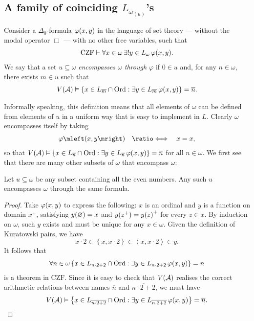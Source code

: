 \documentclass[12pt,openany]{book}
\theoremstyle{plain}
\theoremstyle{definition}
\newcommand\tuple[1]{\left\langle #1 \right\rangle}
\newcommand\opA[1]{\mathop{\forall #1}}
\newcommand\opE[1]{\mathop{\exists #1}}
\newcommand\defeqv{\quad \ratio\Longleftrightarrow \quad}
\newcommand\CZF{\mathrm{CZF}}
\newcommand\Ord{\mathrm{Ord}}
\begin{document}
\subsection*{A family of coinciding $L_{\overline{\omega}_{(u)}}$'s}

Consider a $\Delta_0$-formula $\varphi\mleft(x, y\mright)$ in the language of set theory --- without the modal operator $\Box$ --- with no other free variables, such that
\[\CZF \vdash \opA{x \in \omega} \opE{!y \in L_\omega} \varphi\mleft(x, y\mright).\]
We say that a set $u \subseteq \omega$ \emph{encompasses $\omega$ through $\varphi$} if $0 \in u$ and, for any $n \in \omega$, there exists $m \in u$ such that
\[V\mleft(\mathcal{A}\mright) \vDash \left\{x \in L_{\overline{m}} \cap \Ord : \opE{y \in L_{\overline{m}}} \varphi\mleft(x, y\mright)\right\} = \overline{n}.\]

Informally speaking, this definition means that all elements of $\omega$ can be defined from elements of $u$ in a uniform way that is easy to implement in $L$. Clearly $\omega$ encompasses itself by taking
\[\varphi\mleft(x, y\mright) \defeqv x = x,\]
so that $V\mleft(\mathcal{A}\mright) \vDash \left\{x \in L_{\overline{n}} \cap \Ord : \opE{y \in L_{\overline{n}}} \varphi\mleft(x, y\mright)\right\} = \overline{n}$ for all $n \in \omega$. We first see that there are many other subsets of $\omega$ that encompass $\omega$:
\begin{lemma}
  Let $u \subseteq \omega$ be any subset containing all the even numbers. Any such $u$ encompasses $\omega$ through the same formula.
\end{lemma}

\begin{proof}
  Take $\varphi\mleft(x, y\mright)$ to express the following: $x$ is an ordinal and $y$ is a function on domain $x^+$, satisfying $y\mleft(\varnothing\mright) = x$ and $y\mleft(z^+\mright) = y\mleft(z\mright)^+$ for every $z \in x$. By induction on $\omega$, such $y$ exists and must be unique for any $x \in \omega$. Given the definition of Kuratowski pairs, we have
  \[x \cdot 2 \in \left\{x, x \cdot 2\right\} \in \tuple{x, x \cdot 2} \in y.\]
  It follows that
  \[\opA{n \in \omega} \left\{x \in L_{n \cdot 2 + 2} \cap \Ord : \opE{y \in L_{n \cdot 2 + 2}} \varphi\mleft(x, y\mright)\right\} = n\]
  is a theorem in $\CZF$. Since it is easy to check that $V\mleft(\mathcal{A}\mright)$ realises the correct arithmetic relations between names $\overline{n}$ and $\overline{n \cdot 2 + 2}$, we must have
  \[V\mleft(\mathcal{A}\mright) \vDash \left\{x \in L_{\overline{n \cdot 2 + 2}} \cap \Ord : \opE{y \in L_{\overline{n \cdot 2 + 2}}} \varphi\mleft(x, y\mright)\right\} = \overline{n}. \qedhere\]
\end{proof}
\end{document}
